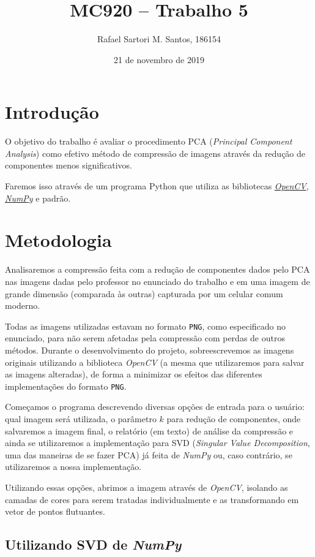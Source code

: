 \documentclass[brazilian,a4paper,twocolumn]{article}
\title{MC920 -- Trabalho 5}
\author{Rafael Sartori M. Santos, 186154}
\date{21 de novembro de 2019}
\begin{document}
\maketitle


\section{Introdução}

    O objetivo do trabalho é avaliar o procedimento PCA (\textit{Principal Component Analysis}) como efetivo método de compressão de imagens através da redução de componentes menos significativos.

    Faremos isso através de um programa Python que utiliza as bibliotecas \href{https://opencv.org/}{\emph{OpenCV}}, \href{https://numpy.org/}{\emph{NumPy}} e padrão.


\section{Metodologia}

    Analisaremos a compressão feita com a redução de componentes dados pelo PCA nas imagens dadas pelo professor no enunciado do trabalho e em uma imagem de grande dimensão (comparada às outras) capturada por um celular comum moderno.

    Todas as imagens utilizadas estavam no formato \texttt{PNG}, como especificado no enunciado, para não serem afetadas pela compressão com perdas de outros métodos. Durante o desenvolvimento do projeto, sobreescrevemos as imagens originais utilizando a biblioteca \emph{OpenCV} (a mesma que utilizaremos para salvar as imagens alteradas), de forma a minimizar os efeitos das diferentes implementações do formato \texttt{PNG}.

    Começamos o programa descrevendo diversas opções de entrada para o usuário: qual imagem será utilizada, o parâmetro $k$ para redução de componentes, onde salvaremos a imagem final, o relatório (em texto) de análise da compressão e ainda se utilizaremos a implementação para SVD (\textit{Singular Value Decomposition}, uma das maneiras de se fazer PCA) já feita de \emph{NumPy} ou, caso contrário, se utilizaremos a nossa implementação.

    Utilizando essas opções, abrimos a imagem através de \emph{OpenCV}, isolando as camadas de cores para serem tratadas individualmente e as transformando em vetor de pontos flutuantes.

    \subsection{Utilizando SVD de \emph{NumPy}}
\end{document}

